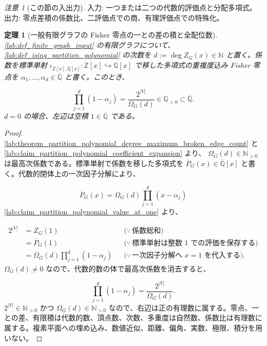 \documentclass[11pt,a4paper]{article}
\newtheorem{theorem}[definition]{定理}
\theoremstyle{remark}
\newtheorem{remark}[definition]{注意}
\begin{document}
\begin{remark}[この節の入出力]
入力: 一つまたは二つの代数的評価点と分配多項式。出力: 零点差積の係数比、二評価点での商、有理評価点での特殊化。

\end{remark}

\begin{theorem}[一般有限グラフの Fisher 零点の一との差の積と全配位数]\label{lab:theorem_fisher_zero_shifted_product_configuration_count}
\cref{lab:def_finite_graph_input}
 の有限グラフについて、
\cref{lab:def_ising_partition_polynomial}
 の次数を 
$d:=\deg Z_G(x)\in\mathbb N$
 と置く。係数を標準単射 
$\iota_{\mathbb Z[x],\overline{\mathbb Q}[x]}:\mathbb Z[x]\hookrightarrow\overline{\mathbb Q}[x]$
 で移した多項式の重複度込み Fisher 零点を 
$\alpha_1,\ldots,\alpha_d\in\overline{\mathbb Q}$
 と書く。このとき、

\[\prod_{j=1}^{d}(1-\alpha_j)
=
\frac{2^{|V|}}{\Omega_G(d)}
\in\mathbb Q_{>0}
\subset\overline{\mathbb Q}.\]
$d=0$
 の場合、左辺は空積 
$1\in\overline{\mathbb Q}$
 である。

\end{theorem}
\begin{proof}
\cref{lab:theorem_partition_polynomial_degree_maximum_broken_edge_count}
 と 
\cref{lab:claim_partition_polynomial_coefficient_expansion}
 より、
$\Omega_G(d)\in\mathbb N_{>0}$
 は最高次係数である。標準単射で係数を移した多項式を 
$\overline P_G(x)\in\overline{\mathbb Q}[x]$
 と書く。代数的閉体上の一次因子分解により、

\[\overline P_G(x)
=
\Omega_G(d)\prod_{j=1}^{d}(x-\alpha_j)\]
\cref{lab:claim_partition_polynomial_value_at_one}
 より、

\[\begin{aligned}
2^{|V|}
&=Z_G(1)
&&\bigl(\because\ \text{係数総和}\bigr)\\
&=\overline P_G(1)
&&\bigl(\because\ \text{標準単射は整数 }1\text{ での評価を保存する}\bigr)\\
&=\Omega_G(d)\prod_{j=1}^{d}(1-\alpha_j)
&&\bigl(\because\ \text{一次因子分解へ }x=1\text{ を代入する}\bigr).
\end{aligned}\]
$\Omega_G(d)\ne0$
 なので、代数的数の体で最高次係数を消去すると、

\[\prod_{j=1}^{d}(1-\alpha_j)
=
\frac{2^{|V|}}{\Omega_G(d)}.\]
$2^{|V|}\in\mathbb N_{>0}$
 かつ 
$\Omega_G(d)\in\mathbb N_{>0}$
 なので、右辺は正の有理数に属する。零点、一との差、有限積は代数的数、頂点数、次数、多重度は自然数、係数比は有理数に属する。複素平面への埋め込み、数値近似、距離、偏角、実数、極限、積分を用いない。

\end{proof}
\end{document}
